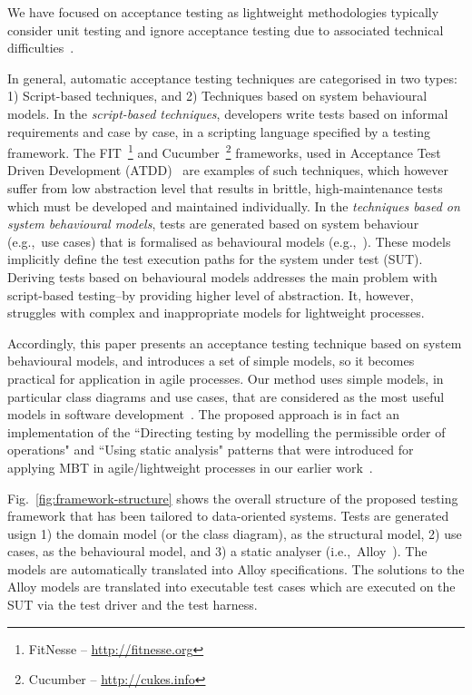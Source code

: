 We have focused on acceptance testing as lightweight methodologies typically consider unit testing and ignore acceptance testing due to associated technical difficulties~\cite{Ambler2008,Ambler}. 

In general, automatic acceptance testing techniques are categorised in two types: 1) Script-based techniques, and 2) Techniques based on system behavioural models. 
In the \textit{script-based techniques}, developers write tests based on informal requirements and case by case, in a scripting language specified by a testing framework. The FIT~\footnote{FitNesse – \url{http://fitnesse.org}} and Cucumber~\footnote{Cucumber – \url{http://cukes.info}} frameworks, used in Acceptance Test Driven Development (ATDD)~\cite{Pugh2011} are examples of such techniques, which however suffer from low abstraction level that results in brittle, high-maintenance tests which must be developed and maintained individually. 
In the \textit{techniques based on system behavioural models}, tests are generated based on system behaviour (e.g.,\ use cases) that is formalised as behavioural models (e.g.,~\cite{Nebut2006,Sarma2007,Kaplan2008}). These models implicitly define the test execution paths for the system under test (SUT). %
Deriving tests based on behavioural models addresses the main problem with script-based testing--by providing higher level of abstraction. It, however, struggles with complex and inappropriate models for lightweight processes. 

Accordingly, this paper presents an acceptance testing technique based on system behavioural models, and introduces a set of simple models, so it becomes practical for application in agile processes. Our method uses simple models, in particular class diagrams and use cases, that are considered as the most useful models in software development~\cite{Erickson2007,Erickson2008}. 
The proposed approach is in fact an implementation of  the ``Directing testing by modelling the permissible order of operations" and ``Using static analysis" patterns that were introduced for applying MBT in agile/lightweight processes in our earlier work~\cite{Jalalinasab2012}.


Fig.~\ref{fig:framework-structure} shows the overall structure of the proposed testing framework that has been tailored to data-oriented systems. Tests are generated usign 1) the domain model (or the class diagram), as the structural model, 2) use cases, as the behavioural model, and 3) a static analyser (i.e.,\ Alloy~\cite{Jackson2002}). The models are automatically translated into Alloy specifications. The solutions to the Alloy models are translated into executable test cases which are executed on the SUT via the test driver and the test harness.

